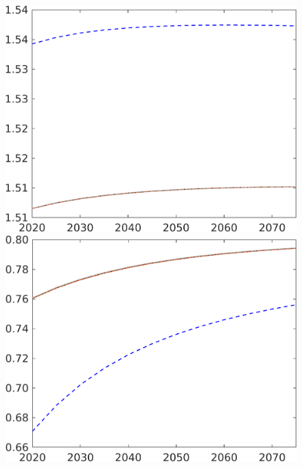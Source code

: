 \begin{figure}[h!!]
\begin{minipage}[]{0.32\textwidth}
\end{minipage}
\begin{minipage}[]{0.32\textwidth}
\includegraphics[width=1\textwidth]{../../codding_model/own_basedOnFried/optimalPol_010922_revision/figures/all_5Sept22/CompRed_TaulCalib_pn_spillover0_nsk0_xgr0_sep1_LFlimit0_emsbase0_countec0_GovRev0_etaa0.79_lgd0.png}
\end{minipage}
\begin{minipage}[]{0.32\textwidth}
\includegraphics[width=1\textwidth]{../../codding_model/own_basedOnFried/optimalPol_010922_revision/figures/all_5Sept22/CompRed_TaulCalib_snS_spillover0_nsk0_xgr0_sep1_LFlimit0_emsbase0_countec0_GovRev0_etaa0.79_lgd0.png}
\end{minipage}
\end{figure}


